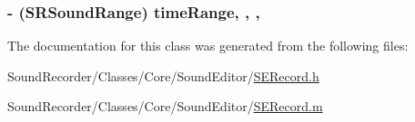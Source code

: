 \hypertarget{interface_s_e_record_ac529abfcc62ecfb7123a8ecae4431822}{
\subsubsection[{time\-Range}]{\setlength{\rightskip}{0pt plus 5cm}-\/ ({\bf S\-R\-Sound\-Range}) time\-Range\hspace{0.3cm}{\ttfamily [read]}, {\ttfamily [write]}, {\ttfamily [nonatomic]}, {\ttfamily [assign]}}}\label{interface_s_e_record_ac529abfcc62ecfb7123a8ecae4431822}


The documentation for this class was generated from the following files\-:\begin{DoxyCompactItemize}
\item 
Sound\-Recorder/\-Classes/\-Core/\-Sound\-Editor/\hyperlink{_s_e_record_8h}{S\-E\-Record.\-h}\item 
Sound\-Recorder/\-Classes/\-Core/\-Sound\-Editor/\hyperlink{_s_e_record_8m}{S\-E\-Record.\-m}\end{DoxyCompactItemize}

